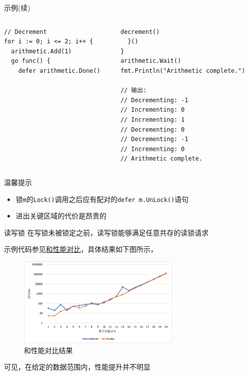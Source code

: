 \begin{frame}[fragile]{示例(续)}
    \begin{columns}[t]
        \begin{column}{0.5\textwidth}
\begin{lstlisting}[caption={\Mutex 使用示例(续)},firstnumber=last,xleftmargin=8pt]
// Decrement
for i := 0; i <= 2; i++ {
  arithmetic.Add(1)
  go func() {
    defer arithmetic.Done()
\end{lstlisting}
        \end{column}
        \begin{column}{0.5\textwidth}
\begin{lstlisting}[caption={\Mutex 使用示例(续)},firstnumber=last,xleftmargin=8pt]
    decrement()
  }()
}
arithmetic.Wait()
fmt.Println("Arithmetic complete.")

// 输出:
// Decrementing: -1
// Incrementing: 0
// Incrementing: 1
// Decrementing: 0
// Decrementing: -1
// Incrementing: 0
// Arithmetic complete.
\end{lstlisting}
        \end{column}
    \end{columns}
\end{frame}

\begin{frame}{温馨提示}
    \begin{itemize}
        \item 锁\texttt{m}的\texttt{Lock()}调用之后应有配对的\texttt{defer m.UnLock()}语句
        \item \alert{进出关键区域的代价是昂贵的}
    \end{itemize}    
\end{frame}
\fi

\begin{frame}{读写锁\RWMutex }
    \alert{在写锁未被锁定之前}，读写锁能够满足任意共存的读锁请求

    \bigskip
    示例代码参见\href{https://github.com/sammyne/concurrency-in-go/blob/master/chapter03/sync.pkg/mutex/rwlock.go}{\Mutex 和\RWMutex 性能对比}，具体结果如下图所示，

    \begin{figure}
        \centering
        \includegraphics[width=0.7\textwidth]{images/rwmutex-vs-mutex.png}
        \caption{\Mutex 和\RWMutex 性能对比结果}
    \end{figure}
    
    \alert{可见，在给定的数据范围内，性能提升并不明显}
\end{frame}

